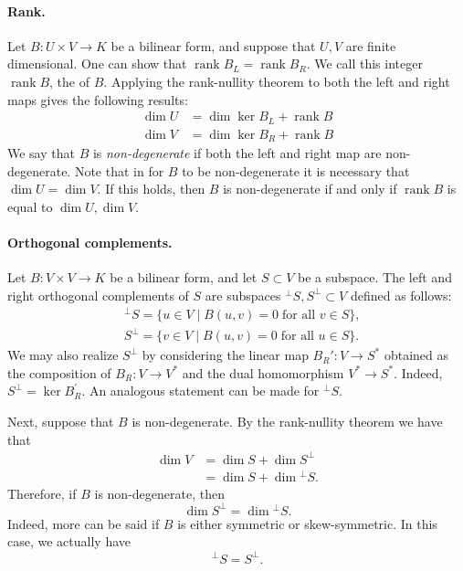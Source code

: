 \documentclass{article}
\newcommand{\rank}{\operatorname{rank}}
\begin{document}
\paragraph{Rank.}
Let $B:U\times V\to K$ be a bilinear form, and suppose that $U,V$ are
finite dimensional. One can show that $\rank B_L = \rank B_R$. We call
this integer $\rank B$, the \emph{} of $B$.
Applying the rank-nullity theorem to both the left and right maps
gives the following results:
\begin{align*}
  \dim U &= \dim \ker {B_L} + \rank B\\
  \dim V &= \dim \ker {B_R} + \rank B
\end{align*}
We say that $B$ is
\emph{non-degenerate} if both the left and right map are
non-degenerate.  Note that in  for $B$ to be non-degenerate it is
necessary that $\dim U = \dim V$.  If this holds, then $B$ is
non-degenerate if and only if $\rank B$ is equal to $\dim U, \dim V$.

\paragraph{Orthogonal complements.}
Let $B:V\times V\to K$ be a bilinear form, and let $S \subset V$ be a
subspace.  The left and right orthogonal complements of $S$ are
subspaces ${^\perp}S, S^\perp \subset V$ defined as follows:
\begin{align*}
&{}^\perp S =  \{ u\in V \mid B(u,v) = 0 \; \text{for all } v \in S \},\\
&S^\perp = \{ v\in V \mid B(u,v) = 0 \; \text{for all } u \in S \} .
\end{align*}
We may also realize $S^\perp$ by considering the linear map $B_{R}':
V\to S^*$ obtained as the composition of  $B_R: 
V\to V^*$ and the dual homomorphism $V^*\to S^*$.
Indeed, $S^\perp = \ker B^\prime_R$. An analogous
statement can be made for ${}^\perp S$.  

Next, suppose that $B$ is non-degenerate.
By the rank-nullity
theorem  we have that
\begin{align*}
  \dim V &= \dim S + \dim  S^\perp\\
  &= \dim S + \dim {}^\perp S.   
\end{align*}
Therefore, if $B$ is non-degenerate, then 
\[\dim  S^\perp = \dim {}^\perp S. \]
Indeed, more can be said if $B$ is either symmetric or 
skew-symmetric.  In this case, we actually have
\[{}^\perp S = S^\perp.\]
\end{document}
